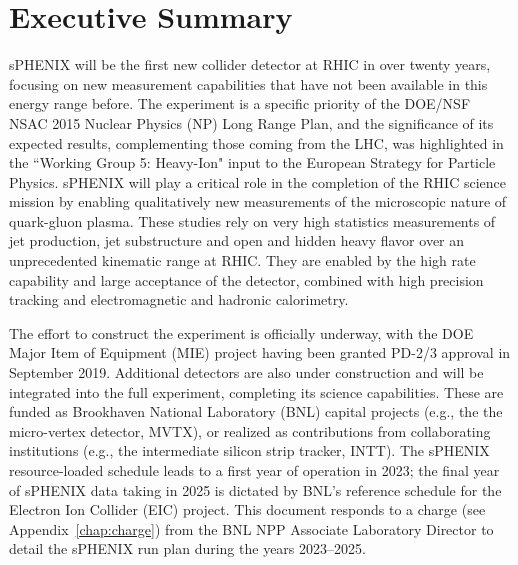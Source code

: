 \chapter*{Executive Summary}
\label{executive_summary}
\setcounter{page}{1}

sPHENIX will be the first new collider detector at RHIC in over twenty
years, focusing on new measurement capabilities that have not been available
in this energy range before.  The experiment
is a specific priority of the DOE/NSF NSAC 2015 Nuclear Physics (NP) 
Long Range Plan, and the significance of its expected results, complementing those coming from
the LHC, was highlighted in the ``Working Group 5: Heavy-Ion" input to the European
Strategy for Particle Physics.  sPHENIX will play a critical role in
the completion of the RHIC science mission by enabling qualitatively
new measurements of the microscopic nature of quark-gluon plasma.
These studies rely on very high statistics measurements of jet
production, jet substructure and open and hidden heavy flavor over an
unprecedented kinematic range at RHIC.  They are enabled by the high
rate capability and large acceptance of the detector, combined with
high precision tracking and electromagnetic and hadronic calorimetry.

The effort to construct the experiment is officially underway, with
the DOE Major Item of Equipment (MIE) project having been granted PD-2/3 approval in September
2019.  Additional detectors are also under construction and will be
integrated into the full experiment, completing its science
capabilities. These are funded as Brookhaven National Laboratory (BNL)
capital projects (e.g., the the micro-vertex detector, MVTX), or realized as contributions from
collaborating institutions (e.g., the intermediate silicon strip tracker, INTT). 
The sPHENIX resource-loaded schedule leads to a first
year of operation in 2023; the final year of sPHENIX data taking in
2025 is dictated by BNL's reference schedule for the Electron Ion Collider (EIC) project.
This document responds to a charge (see Appendix~\ref{chap:charge})
from the BNL NPP Associate Laboratory Director to detail the sPHENIX run plan during the years 2023--2025.

